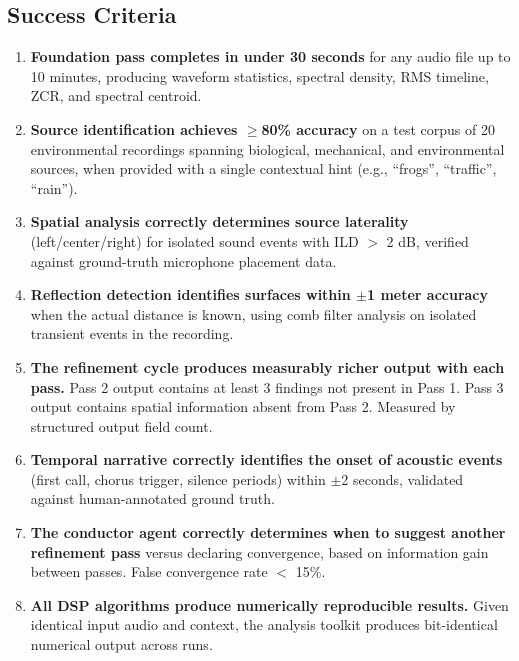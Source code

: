 \documentclass[11pt,letterpaper]{article}
\begin{document}
\subsection{Success Criteria}

\begin{enumerate}[leftmargin=2em]
\item \textbf{Foundation pass completes in under 30 seconds} for any audio file up to 10 minutes, producing waveform statistics, spectral density, RMS timeline, ZCR, and spectral centroid.

\item \textbf{Source identification achieves $\geq$80\% accuracy} on a test corpus of 20 environmental recordings spanning biological, mechanical, and environmental sources, when provided with a single contextual hint (e.g., ``frogs'', ``traffic'', ``rain'').

\item \textbf{Spatial analysis correctly determines source laterality} (left/center/right) for isolated sound events with ILD $>$ 2 dB, verified against ground-truth microphone placement data.

\item \textbf{Reflection detection identifies surfaces within $\pm$1 meter accuracy} when the actual distance is known, using comb filter analysis on isolated transient events in the recording.

\item \textbf{The refinement cycle produces measurably richer output with each pass.} Pass 2 output contains at least 3 findings not present in Pass 1. Pass 3 output contains spatial information absent from Pass 2. Measured by structured output field count.

\item \textbf{Temporal narrative correctly identifies the onset of acoustic events} (first call, chorus trigger, silence periods) within $\pm$2 seconds, validated against human-annotated ground truth.

\item \textbf{The conductor agent correctly determines when to suggest another refinement pass} versus declaring convergence, based on information gain between passes. False convergence rate $<$ 15\%.

\item \textbf{All DSP algorithms produce numerically reproducible results.} Given identical input audio and context, the analysis toolkit produces bit-identical numerical output across runs.


\end{enumerate}
\end{document}
